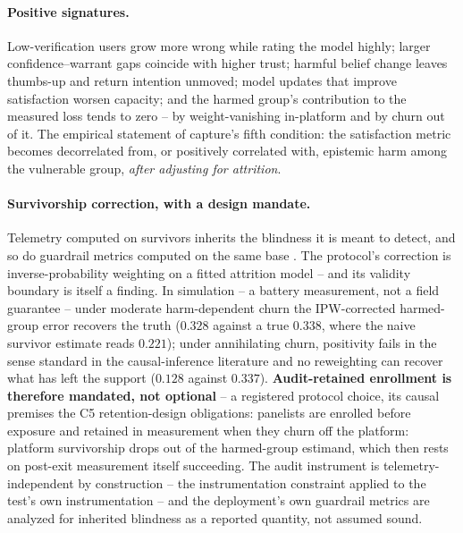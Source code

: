 \documentclass[11pt]{article}
\theoremstyle{definition}
\theoremstyle{remark}
\numberwithin{equation}{section}
\begin{document}
\paragraph{Positive signatures.} Low-verification users grow more wrong while rating the model highly; larger confidence--warrant gaps coincide with higher trust; harmful belief change leaves thumbs-up and return intention unmoved; model updates that improve satisfaction worsen capacity; and the harmed group's contribution to the measured loss tends to zero -- by weight-vanishing in-platform and by churn out of it. The empirical statement of capture's fifth condition: the satisfaction metric becomes decorrelated from, or positively correlated with, epistemic harm among the vulnerable group, \emph{after adjusting for attrition}.

\paragraph{Survivorship correction, with a design mandate.} Telemetry computed on survivors inherits the blindness it is meant to detect, and so do guardrail metrics computed on the same base \citep{hofheinz2026drift}. The protocol's correction is inverse-probability weighting on a fitted attrition model \citep{robins1994estimation} -- and its validity boundary is itself a finding. In simulation -- a battery measurement, not a field guarantee -- under moderate harm-dependent churn the IPW-corrected harmed-group error recovers the truth ($0.328$ against a true $0.338$, where the naive survivor estimate reads $0.221$); under annihilating churn, positivity fails in the sense standard in the causal-inference literature \citep{hernan2020causal} and no reweighting can recover what has left the support ($0.128$ against $0.337$). \textbf{Audit-retained enrollment is therefore mandated, not optional} -- a registered protocol choice, its causal premises the C5 retention-design obligations: panelists are enrolled before exposure and retained in measurement when they churn off the platform: platform survivorship drops out of the harmed-group estimand, which then rests on post-exit measurement itself succeeding. The audit instrument is telemetry-independent by construction -- the instrumentation constraint applied to the test's own instrumentation -- and the deployment's own guardrail metrics are analyzed for inherited blindness as a reported quantity, not assumed sound.
\end{document}

